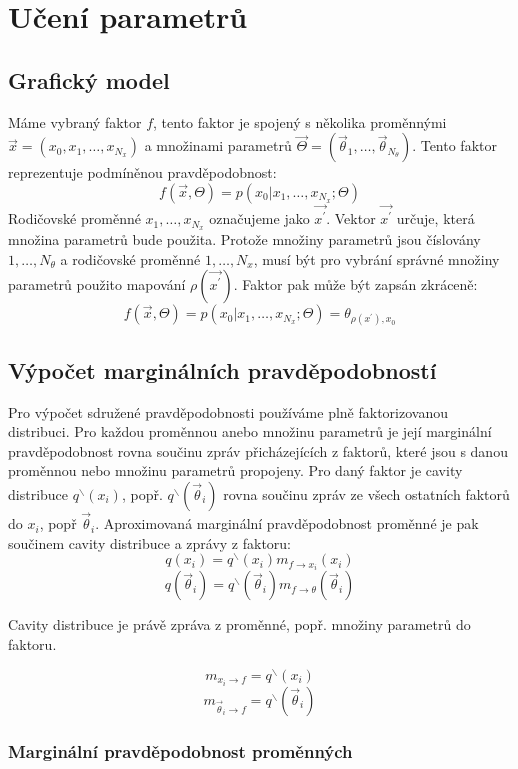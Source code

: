 \chapter{Učení parametrů}

\section{Grafický model}

Máme vybraný faktor $f$, tento faktor je spojený s několika proměnnými
$\vec{x} = (x_0, x_1, \dots, x_{N_x})$
a množinami parametrů
$\vec{\Theta} = (\vec{\theta}_1, \dots, \vec{\theta}_{N_\theta})$.
Tento faktor reprezentuje podmíněnou pravděpodobnost:
$$f(\vec{x}, \Theta) = p(x_0 | x_1, \dots, x_{N_x}; \Theta)$$
Rodičovské proměnné $x_1, \dots, x_{N_x}$ označujeme jako $\vec{x^\prime}$.
Vektor $\vec{x^\prime}$ určuje, která množina parametrů bude použita.
Protože množiny parametrů jsou číslovány $1, \dots, N_\theta$ a rodičovské
proměnné $1, \dots, N_x$, musí být pro vybrání správné množiny parametrů
použito mapování $\rho(\vec{x^\prime})$.
Faktor pak může být zapsán zkráceně:
$$f(\vec{x}, \Theta) = p(x_0 | x_1, \dots, x_{N_x}; \Theta) =
\theta_{\rho(x^\prime), x_0}$$

\section{Výpočet marginálních pravděpodobností}

Pro výpočet sdružené pravděpodobnosti používáme plně faktorizovanou distribuci.
Pro každou proměnnou anebo množinu parametrů je její marginální pravděpodobnost
rovna součinu zpráv přicházejících z faktorů, které jsou s danou proměnnou
nebo množinu parametrů propojeny.
Pro daný faktor je cavity distribuce $q^\backslash(x_i)$, popř.
$q^\backslash(\vec{\theta}_i)$ rovna součinu zpráv ze všech ostatních faktorů do $x_i$, popř $\vec\theta_i$.
Aproximovaná marginální pravděpodobnost proměnné je pak součinem cavity
distribuce a zprávy z faktoru:
$$q(x_i) = q^\backslash(x_i) m_{f \rightarrow x_i}(x_i)$$
$$q(\vec{\theta}_i) = q^\backslash(\vec{\theta}_i) m_{f\rightarrow \theta}(\vec{\theta}_i)$$

Cavity distribuce je právě zpráva z proměnné, popř. množiny parametrů do faktoru.

$$m_{x_i \rightarrow f} = q^\backslash (x_i)$$
$$m_{\vec\theta_i \rightarrow f} = q^\backslash (\vec\theta_i)$$

\subsection{Marginální pravděpodobnost proměnných}


